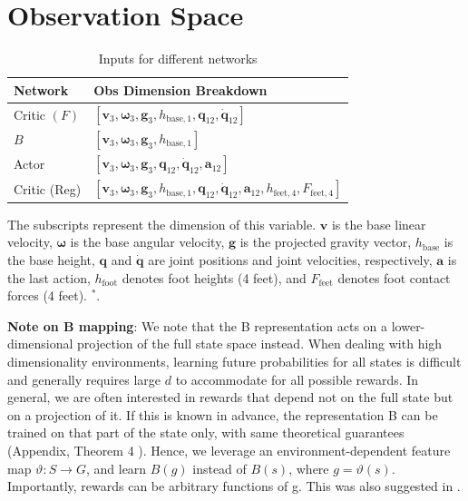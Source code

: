 \section{Observation Space}
\label{appendix:observation-space}
\begin{table}[H]
  \centering
  \renewcommand{\arraystretch}{1.15}
  \begin{tabular}{l l}
    \toprule
    Network & Obs Dimension Breakdown\\
    \midrule

    Critic $(F)$ 
    & $ \left[ \mathbf{v}_{3}, \boldsymbol{\omega}_{3}, \mathbf{g}_{3}, h_{\text{base},1}, \mathbf{q}_{12}, \dot{\mathbf{q}}_{12} \right]$ \\

    $B$ 
    & $ \left[ \mathbf{v}_{3}, \boldsymbol{\omega}_{3}, \mathbf{g}_{3}, h_{\text{base},1} \right]$ \\

    Actor
    & $ \left[ \mathbf{v}_{3}, \boldsymbol{\omega}_{3}, \mathbf{g}_{3}, \mathbf{q}_{12}, \dot{\mathbf{q}}_{12}, \mathbf{a}_{12} \right]$ \\

    Critic (Reg)
    & $\left[ \mathbf{v}_{3}, \boldsymbol{\omega}_{3}, \mathbf{g}_{3}, h_{\text{base},1}, \mathbf{q}_{12}, \dot{\mathbf{q}}_{12}, \mathbf{a}_{12}, h_{\text{feet},4}, F_{\text{feet},4} \right]$ \\

    \bottomrule
  \end{tabular}

  \caption{Inputs for different networks}
  \label{tab:fb_inputs}
\end{table}

    \footnotesize
    \begin{flushleft}
    The subscripts represent the dimension of this variable. $\mathbf{v}$ is the base linear velocity, $\boldsymbol{\omega}$ is the base angular velocity, $\mathbf{g}$ is the projected gravity vector, $h_{\text{base}}$ is the base height, $\mathbf{q}$ and $\dot{\mathbf{q}}$ are joint positions and joint velocities, respectively, $\mathbf{a}$ is the last action, $h_{\text{foot}}$ denotes foot heights (4 feet), and $F_{\text{feet}}$ denotes foot contact forces (4 feet). $^{*}$.
    \end{flushleft}
    \normalsize

\textbf{Note on B mapping}: We note that the B representation acts on a lower-dimensional projection of the full state space instead.  When dealing with high dimensionality environments, learning future probabilities for all states is difficult and generally requires large $d$ to accommodate for all possible rewards.
In general, we are often interested in rewards that depend not on the full state but on a projection of it.
If this is known in advance, the representation B can be trained on that part of the state only, with same theoretical guarantees (Appendix, Theorem 4 \citep{touati2021learning}). Hence, we leverage an environment-dependent feature map $\vartheta: S \rightarrow G$, and learn $B(g)$ instead of $B(s)$, where $g=\vartheta(s)$.
Importantly, rewards can be arbitrary functions of g. This was also suggested in \citep{touati2021learning}.


